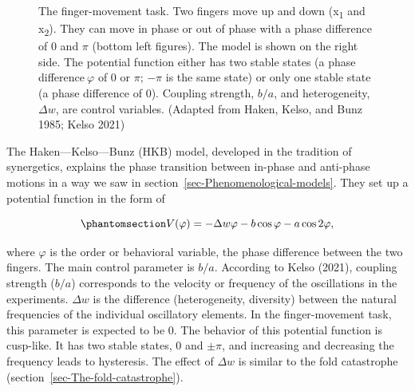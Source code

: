 \documentclass[
  a4paper,
  DIV=11,
  numbers=noendperiod,
  oneside]{scrreprt}
\begin{document}
\begin{figure}


\caption{\label{fig-ch5n-img7-old-45}The finger-movement task. Two
fingers move up and down (x\textsubscript{1} and x\textsubscript{2}).
They can move in phase or out of phase with a phase difference of 0 and
\(\pi\) (bottom left figures). The model is shown on the right side. The
potential function either has two stable states (a phase
difference\(\ \varphi\) of 0 or \(\pi\); \(- \pi\) is the same state) or
only one stable state (a phase difference of 0). Coupling strength,
\(b/a\), and heterogeneity, \(\Delta w\), are control variables.
(Adapted from Haken, Kelso, and Bunz 1985; Kelso 2021)}

\end{figure}%

The Haken---Kelso---Bunz (HKB) model, developed in the tradition of
synergetics, explains the phase transition between in-phase and
anti-phase motions in a way we saw in
section~\ref{sec-Phenomenological-models}. They set up a potential
function in the form of

\begin{equation}\phantomsection\label{eq-ch5n-4-old-20}{
V(\varphi) = - \Delta w\varphi - b\cos\varphi - a\cos{2\varphi},}\end{equation}

where \(\varphi\) is the order or behavioral variable, the phase
difference between the two fingers. The main control parameter is
\(b/a\). According to Kelso (2021), coupling strength (\(b/a\))
corresponds to the velocity or frequency of the oscillations in the
experiments. \(\Delta w\) is the difference (heterogeneity, diversity)
between the natural frequencies of the individual oscillatory elements.
In the finger-movement task, this parameter is expected to be 0. The
behavior of this potential function is cusp-like. It has two stable
states, 0 and \(\pm \pi\), and increasing and decreasing the frequency
leads to hysteresis. The effect of \(\Delta w\) is similar to the fold
catastrophe (section~\ref{sec-The-fold-catastrophe}).
\end{document}

